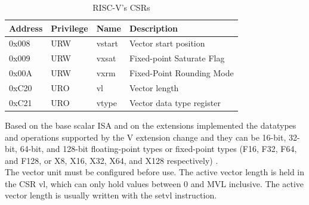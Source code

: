 \begin{table}[H]
    \centering
    \begin{tabular}{|l|l|l|l|}
        \hline
        Address & Privilege & Name   & Description               \\ \hline
        0x008   & URW       & vstart & Vector start position     \\ \hline
        0x009   & URW       & vxsat  & Fixed-point Saturate Flag \\ \hline
        0x00A   & URW       & vxrm   & Fixed-Point Rounding Mode \\ \hline
        0xC20   & URO       & vl     & Vector length             \\ \hline
        0xC21   & URO       & vtype  & Vector data type register \\ \hline
    \end{tabular}
    \caption{RISC-V's CSRs}
    \label{CSRs}
\end{table}

Based on the base scalar ISA and on the extensions implemented the datatypes and operations supported by the V extension change and they can be 16-bit, 32-bit, 64-bit, and 128-bit ﬂoating-point types or fixed-point types (F16, F32, F64, and F128, or X8, X16, X32, X64, and X128 respectively) \cite{riscv-v-specs}.\\


The vector unit must be conﬁgured before use. 
The active vector length is held in the CSR vl, which can only hold values between 0 and MVL inclusive.
The active vector length is usually written with the setvl instruction.\\

